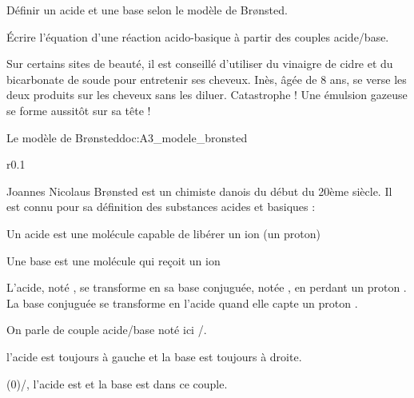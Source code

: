\tetePremStssChim
{}

\begin{objectifs}
  \item Définir un acide et une base selon le modèle de Br\o{}nsted.
  \item Écrire l’équation d’une réaction acido-basique à partir des couples acide/base.
\end{objectifs}

\begin{contexte}
  Sur certains sites de beauté, il est conseillé d’utiliser du vinaigre de cidre et du bicarbonate de soude pour entretenir ses cheveux.
  Inès, âgée de 8 ans, se verse les deux produits sur les cheveux sans les diluer.
  Catastrophe ! Une émulsion gazeuse se forme aussitôt sur sa tête !

\end{contexte}

\begin{doc}{Le modèle de Br\o{}nsted}{doc:A3_modele_bronsted}
  \begin{wrapfigure}[3]{r}{0.1\linewidth}
  \end{wrapfigure}

  Joannes Nicolaus Br\o{}nsted est un chimiste danois du début du 20ème siècle.
  Il est connu pour sa définition des substances acides et basiques : 
  \begin{importants}    
    \begin{listePoints}
      \item Un acide est une molécule capable de libérer un ion \ionHydrogene (un proton)
      \item Une base est une molécule qui reçoit un ion \ionHydrogene
    \end{listePoints}
  \end{importants}
  
  L'acide, noté , se transforme en sa base conjuguée, notée , en perdant un proton \ionHydrogene.
  La base conjuguée  se transforme en l'acide  quand elle capte un proton \ionHydrogene.

  \begin{importants}
    On parle de couple acide/base noté ici /.    
  \end{importants}
  \attention l'acide est toujours à gauche et la base est toujours à droite.

  \exemple
  \texteTrou(0){/\chlorure, l'acide est  et la base \chlorure est dans ce couple.}
\end{doc}

